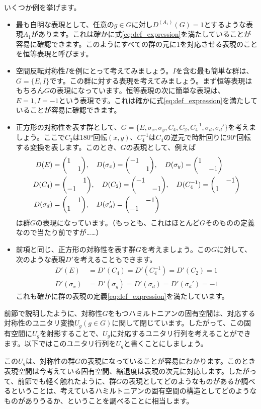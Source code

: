 \documentclass[uplatex,dvipdfmx,a4j]{jsarticle}
\begin{document}
いくつか例を挙げます。
\begin{itemize}
	\item 最も自明な表現として、任意の$g\in G$に対し$D^{(A_1)}(G) = 1$とするような表現$A_1$があります。これは確かに式\eqref{eq:def_expression}を満たしていることが容易に確認できます。このようにすべての群の元に1を対応させる表現のことを恒等表現と呼びます。
	\item 空間反転対称性$I$を例にとって考えてみましょう。$I$を含む最も簡単な群は、$G = \{E,I\}$です。この群に対する表現を考えてみましょう。まず恒等表現はもちろん$G$の表現になっています。恒等表現の次に簡単な表現は、$E=1, I=-1$という表現です。これは確かに式\eqref{eq:def_expression}を満たしていることが容易に確認できます。
	\item 正方形の対称性を表す群として、$G = \{ E, \sigma_x, \sigma_y, C_4, C_2, C_4^{-1}, \sigma_d, \sigma_d'\}$を考えましょう。ここで$C_2$は180°回転$(x,y)$、$C_4^{-1}$は$C_4$の逆元で時計回りに90°回転する変換を表します。このとき、$G$の表現として、例えば\begin{align}
		D(E) &= \mqty(\dmat{1,1}) \qc D(\sigma_x) = \mqty(\dmat{-1,1}) \qc D(\sigma_y) = \mqty(\dmat{1,-1}) \\
		D(C_4) &= \mqty(\admat{1,-1}) \qc D(C_2) = \mqty(\dmat{-1,-1}) \qc D(C_4^{-1}) = \mqty(\admat{-1,1}) \\
		D(\sigma_d) &= \mqty(\admat{1,1}) \qc D(\sigma_d') = \mqty(\admat{-1,-1}) \label{eq:square_rep}
	\end{align}
	は群$G$の表現になっています。（もっとも、これはほとんど$G$そのものの定義なので当たり前ですが……）
	\item 前項と同じ、正方形の対称性を表す群$G$を考えましょう。この$G$に対して、次のような表現$D'$を考えることもできます。\begin{align}
		D'(E) &= D'(C_4) = D'(C_4^{-1}) = D'(C_2) = 1\\
		D'(\sigma_x) &= D'(\sigma_y) = D'(\sigma_d) = D'(\sigma_d') = -1
	\end{align}
	これも確かに群の表現の定義\eqref{eq:def_expression}を満たしています。
\end{itemize}

前節で説明したように、対称性$G$をもつハミルトニアンの固有空間は、対応する対称性のユニタリ変換$U_g(g\in G)$に関して閉じています。したがって、この固有空間に$U_g$を射影することで、$U_g$に対応するユニタリ行列を考えることができます。以下ではこのユニタリ行列を$U_g$と書くことにしましょう。

この$U_g$は、対称性の群$G$の表現になっていることが容易にわかります。このとき表現空間は今考えている固有空間、縮退度は表現の次元に対応します。したがって、前節でも軽く触れたように、群$G$の表現としてどのようなものがあるか調べるということは、考えているハミルトニアンの固有空間の構造としてどのようなものがありうるか、ということを調べることに相当します。
\end{document}
